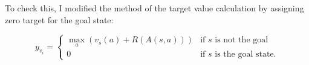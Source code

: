 To check this, I modified the method of the target value calculation by assigning zero target for the goal state: 

\begin{equation*}
y_{v_i} = \begin{cases}
\max_a(v_s(a) + R(A(s, a)))& \text{if $s$ is not the goal}\\
0& \text{if $s$ is the goal state.}
\end{cases}
\end{equation*}


